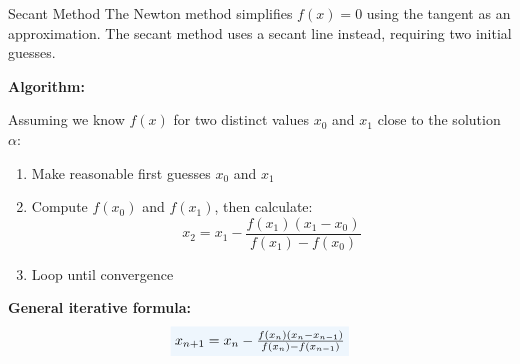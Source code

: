 \documentclass[aspectratio=169]{beamer}
\newcommand{\highlight}[2]{\colorbox{#1!9}{$#2$}}
\begin{document}
\begin{frame}{Secant Method}
   \small
   The Newton method simplifies $f(x) = 0$ using the tangent as an approximation. The \alert{secant method} uses a secant line instead, requiring two initial guesses.
   
   \vspace{0.5em}
   
   \textcolor{accentcolor}{\textbf{Algorithm:}}
   
   Assuming we know $f(x)$ for two distinct values $x_0$ and $x_1$ close to the solution $\alpha$:
   
   \vspace{0.3em}
    \begin{enumerate}
        \item Make reasonable first guesses $x_{0}$ and $x_{1}$
        
        \item Compute $f(x_0)$ and $f(x_1)$, then calculate:
        \begin{equation*}
            x_2 = x_1 - \frac{f(x_1)(x_1 - x_0)}{f(x_1) - f(x_0)}
        \end{equation*}
        
        \item Loop until convergence
    \end{enumerate}

    \vspace{0.1em}
    \textcolor{accentcolor}{\textbf{General iterative formula:}}
    \begin{equation*}
        \highlight{accentcolor}{x_{n+1} = x_{n} - \frac{f(x_{n})(x_n - x_{n-1})}{f(x_n) - f(x_{n-1})}}
    \end{equation*}
\end{frame}
\end{document}

